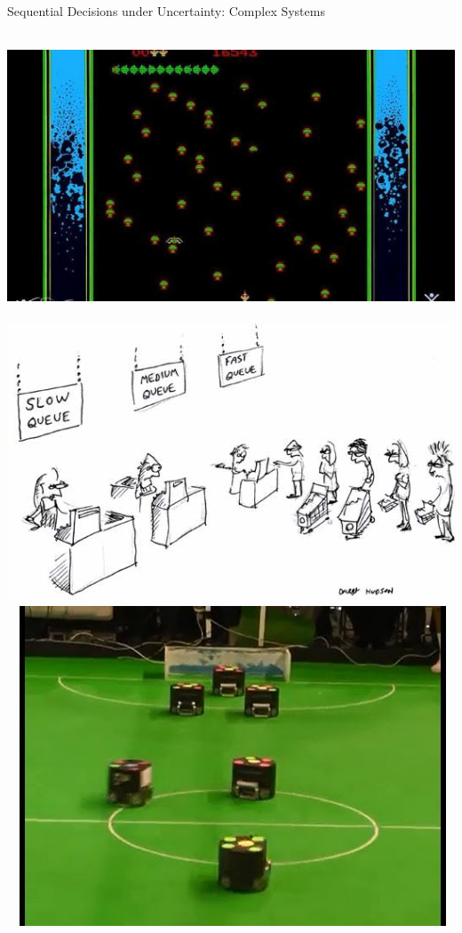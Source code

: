 \documentclass[10pt]{beamer}
\begin{document}
\begin{frame}[fragile]{Sequential Decisions under Uncertainty: Complex Systems}

$\mbox{ }$
\includegraphics[scale=0.125]{atari.jpg}
$\mbox{ }$
\includegraphics[scale=0.125]{queues1.jpg}
$\mbox{ }$
\includegraphics[scale=0.125]{robosoc.jpg}

\end{frame}
\end{document}
